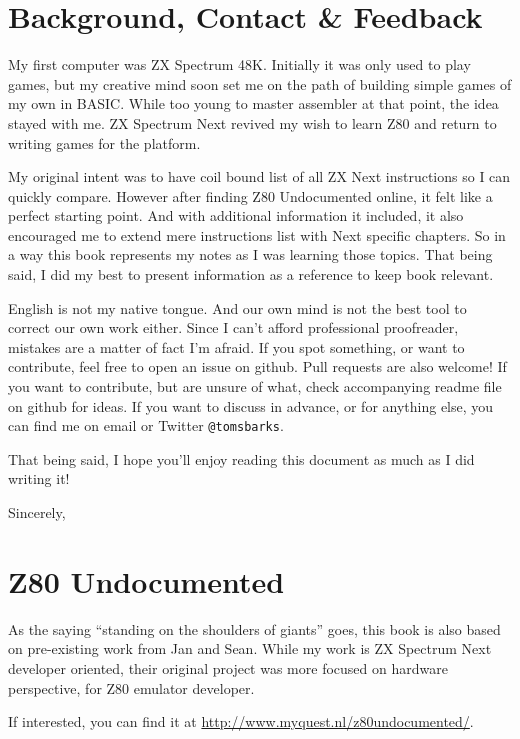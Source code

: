 \documentclass[12pt,twoside,openright,a4paper]{book}
\begin{document}
\pagebreak %
\section{Background, Contact \& Feedback}

My first computer was ZX Spectrum 48K. Initially it was only used to play games, but my creative mind soon set me on the path of building simple games of my own in BASIC. While too young to master assembler at that point, the idea stayed with me. ZX Spectrum Next revived my wish to learn Z80 and return to writing games for the platform.
	
My original intent was to have coil bound list of all ZX Next instructions so I can quickly compare. However after finding Z80 Undocumented online, it felt like a perfect starting point. And with additional information it included, it also encouraged me to extend mere instructions list with Next specific chapters. So in a way this book represents my notes as I was learning those topics. That being said, I did my best to present information as a reference to keep book relevant.

English is not my native tongue. And our own mind is not the best tool to correct our own work either. Since I can't afford professional proofreader, mistakes are a matter of fact I'm afraid. If you spot something, or want to contribute, feel free to open an issue on github. Pull requests are also welcome! If you want to contribute, but are unsure of what, check accompanying readme file on github for ideas. If you want to discuss in advance, or for anything else, you can find me on email  or Twitter {\tt @tomsbarks}.

That being said, I hope you'll enjoy reading this document as much as I did writing it!

Sincerely, \AuthorName


\pagebreak
\section{Z80 Undocumented}

As the saying ``standing on the shoulders of giants'' goes, this book is also based on pre-existing work from Jan and Sean. While my work is ZX Spectrum Next developer oriented, their original project was more focused on hardware perspective, for Z80 emulator developer.

If interested, you can find it at \url{http://www.myquest.nl/z80undocumented/}.
\end{document}
